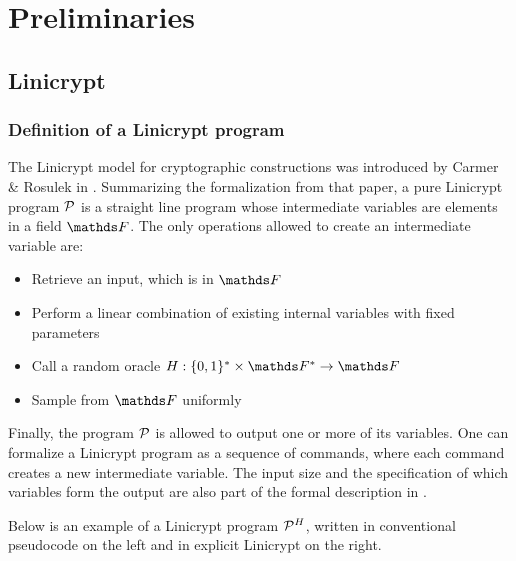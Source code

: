 \chapter{Preliminaries}

\section{Linicrypt}
\subsection{Definition of a Linicrypt program}

The Linicrypt model for cryptographic constructions was introduced by Carmer \& Rosulek in \cite{C:CarRos16}.
Summarizing the formalization from that paper,
a pure Linicrypt program $\P$ is a straight line program
whose intermediate variables are elements in a field $\F$.
The only operations allowed to create an intermediate variable are:
\begin{itemize}
  \item Retrieve an input, which is in $\F$
  \item Perform a linear combination of existing internal variables with fixed parameters
  \item Call a random oracle $\H: \{0,1\}^* \times \F^* \to \F$
  \item Sample from $\F$ uniformly
\end{itemize}
Finally, the program $\P$ is allowed to output one or more of its variables.
One can formalize a Linicrypt program as a sequence of commands,
where each command creates a new intermediate variable.
The input size and the specification of which variables form the output are also part of the formal description in \cite{C:CarRos16}.

Below is an example of a Linicrypt program $\P^\H$,
written in conventional pseudocode on the left and in explicit Linicrypt on the right. 

\begin{pchstack}[center, space=0.4cm]
  \pseudocode[valign=c]{\rightsquigarrow}
\end{pchstack}

